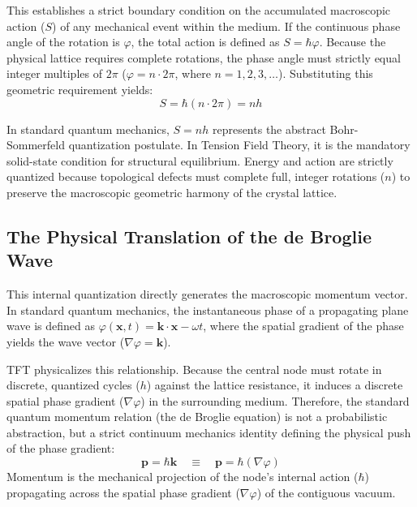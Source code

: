 This establishes a strict boundary condition on the accumulated macroscopic action ($S$) of any mechanical event within the medium. If the continuous phase angle of the rotation is $\varphi$, the total action is defined as $S = \hbar \varphi$. Because the physical lattice requires complete rotations, the phase angle must strictly equal integer multiples of $2\pi$ ($\varphi = n \cdot 2\pi$, where $n = 1, 2, 3, \ldots$). Substituting this geometric requirement yields:
\begin{equation}
    S = \hbar (n \cdot 2\pi) = n h
\end{equation}

In standard quantum mechanics, $S = n h$ represents the abstract Bohr-Sommerfeld quantization postulate. In Tension Field Theory, it is the mandatory solid-state condition for structural equilibrium. Energy and action are strictly quantized because topological defects must complete full, integer rotations ($n$) to preserve the macroscopic geometric harmony of the crystal lattice.
\vspace{0.3em}

\subsection*{The Physical Translation of the de Broglie Wave}
This internal quantization directly generates the macroscopic momentum vector. In standard quantum mechanics, the instantaneous phase of a propagating plane wave is defined as $\varphi(\mathbf{x},t) = \mathbf{k} \cdot \mathbf{x} - \omega t$, where the spatial gradient of the phase yields the wave vector ($\nabla\varphi = \mathbf{k}$).

TFT physicalizes this relationship. Because the central node must rotate in discrete, quantized cycles ($h$) against the lattice resistance, it induces a discrete spatial phase gradient ($\nabla\varphi$) in the surrounding medium. Therefore, the standard quantum momentum relation (the de Broglie equation) is not a probabilistic abstraction, but a strict continuum mechanics identity defining the physical push of the phase gradient:
\begin{equation}
    \mathbf{p} = \hbar \mathbf{k} \quad \equiv \quad \mathbf{p} = \hbar (\nabla\varphi)
\end{equation}
Momentum is the mechanical projection of the node's internal action ($\hbar$) propagating across the spatial phase gradient ($\nabla\varphi$) of the contiguous vacuum.

